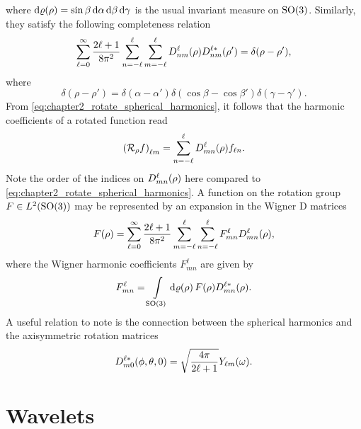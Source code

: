 %
where \(\rotationVolume = \sin{\beta}\dd{\alpha}\dd{\beta}\dd{\gamma}\) is the usual invariant measure on \(\rotationGroup{}\).
Similarly, they satisfy the following completeness relation
%
\begin{equation}
	\sum\limits_{\ell=0}^{\infty} \frac{2\ell+1}{8\pi^{2}} \wignerSum \sum\limits_{m=-\ell}^{\ell} \wigner{\ell}{n}{m}(\rho) \wigner[\ast]{\ell}{n}{m}(\rho')
	= \delta(\rho-\rho'),
\end{equation}
%
where
%
\begin{equation}
	\delta(\rho-\rho')
	= \delta(\alpha-\alpha') \delta(\cos{\beta} - \cos{\beta'}) \delta(\gamma-\gamma').
\end{equation}
%
From \cref{eq:chapter2_rotate_spherical_harmonics}, it follows that the harmonic coefficients of a rotated function read
%
\begin{equation}\label{eq:chapter2_rotation_operator}
	\harmonic{(\rotation{\rho}f)}
	= \wignerSum \wigner{\ell}{m}{n}(\rho) f_{\ell n}.
\end{equation}
%
Note the order of the indices on \(\wigner{\ell}{m}{n}(\rho)\) here compared to \cref{eq:chapter2_rotate_spherical_harmonics}.
A function on the rotation group \(F \in \hilbert{\rotationGroup}\) may be represented by an expansion in the Wigner D matrices
%
\begin{equation}
	F(\rho)
	= \sum\limits_{\ell=0}^{\infty} \frac{2\ell+1}{8\pi^{2}} \sum\limits_{m=-\ell}^{\ell} \wignerSum F^{\ell}_{m n} \wigner{\ell}{m}{n}(\rho),
\end{equation}
%
where the Wigner harmonic coefficients \(F^{\ell}_{m n}\) are given by
%
\begin{equation}
	F^{\ell}_{m n}
	= \integrateRotation{\rho} F(\rho) \wigner[\ast]{\ell}{m}{n}(\rho).
\end{equation}
%
A useful relation to note is the connection between the spherical harmonics and the axisymmetric rotation matrices
%
\begin{equation}\label{eq:chapter2_wigner_axisymmetric}
	\wigner[\ast]{\ell}{m}{0}(\phi,\theta,0)
	= \sqrt{\inverseFactor} \pixel{\harmonic{Y}}.
\end{equation}



\section{Wavelets}\label{sec:chapter2_wavelets}

